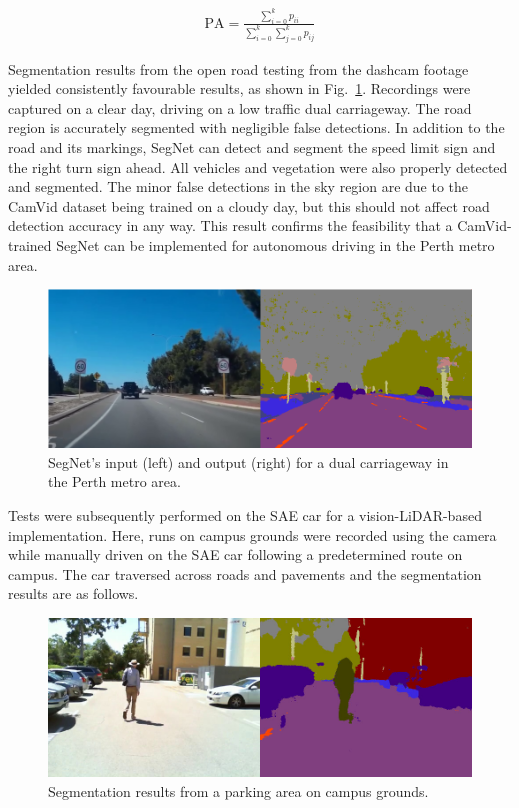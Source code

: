 \begin{align}
\mathrm{PA} = \frac{\sum_{i=0}^k p_{ii}}{\sum_{i=0}^k \sum_{j=0}^k p_{ij}}
\end{align}


Segmentation results from the open road testing from the dashcam footage yielded consistently favourable results, as shown in Fig.~\ref{fig:5:road}. Recordings were captured on a clear day, driving on a low traffic dual carriageway. The road region is accurately segmented with negligible false detections. In addition to the road and its markings, SegNet can detect and segment the speed limit sign and the right turn sign ahead. All vehicles and vegetation were also properly detected and segmented. The minor false detections in the sky region are due to the CamVid dataset being trained on a cloudy day, but this should not affect road detection accuracy in any way. This result confirms the feasibility that a CamVid-trained SegNet can be implemented for autonomous driving in the Perth metro area.

\begin{figure}[H]
	\centering
	\includegraphics[width=0.8\linewidth]{segnet}
	\caption[SegNet results on a Perth dual carriageway]{SegNet's input (left) and output (right) for a dual carriageway in the Perth metro area.}
	\label{fig:5:road}
\end{figure}

Tests were subsequently performed on the SAE car for a vision-LiDAR-based implementation. Here, runs on campus grounds were recorded using the camera while manually driven on the SAE car following a predetermined route on campus. The car traversed across roads and pavements and the segmentation results are as follows.

\begin{figure}[H]
	\centering
	\includegraphics[width=0.8\linewidth]{2}
	\caption{Segmentation results from a parking area on campus grounds.}
	\label{fig:5:carpark}
\end{figure}

